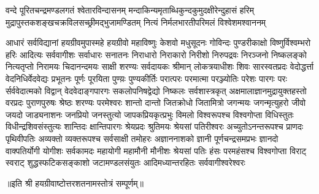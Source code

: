 
\fourlineindentedshloka
{वन्दे पूरितचन्द्रमण्डलगतं श्वेतारविन्दासनम्}
{मन्दाकिन्यमृताब्धिकुन्दकुमुदक्षीरेन्दुहासं हरिम्}
{मुद्रापुस्तकशङ्खचक्रविलसच्छ्रीमद्भुजामण्डितम्}
{नित्यं निर्मलभारतीपरिमलं विश्वेशमश्वाननम्}

{आधारं सर्वविद्यानां हयग्रीवमुपास्महे}
\twolineshloka
{हयग्रीवो महाविष्णुः केशवो मधुसूदनः}
{गोविन्दः पुण्डरीकाक्षो विष्णुर्विश्वम्भरो हरिः}
\twolineshloka
{आदित्यः सर्ववागीशः सर्वाधारः सनातनः}
{निराधारो निराकारो निरीशो निरुपद्रवः}
\twolineshloka
{निरञ्जनो  निष्कलङ्को नित्यतृप्तो निरामयः}
{चिदानन्दमयः साक्षी शरण्यः सर्वदायकः}
\twolineshloka
{श्रीमान् लोकत्रयाधीशः शिवः सारस्वतप्रदः}
{वेदोद्धर्त्ता वेदनिधिर्वेदवेद्यः प्रभूतनः}
\twolineshloka
{पूर्णः पूरयिता पुण्य़ः पुण्यकीर्तिः परात्परः}
{परमात्मा परञ्ज्योतिः परेशः पारगः परः}
\twolineshloka
{र्सर्ववेदात्मको विद्वान् वेदवेदाङ्गपारगः}
{सकलोपनिषद्वेद्यो निष्कलः सर्वशास्त्रकृत्}
\twolineshloka
{अक्षमालाज्ञानमुद्रायुक्तहस्तो वरप्रदः}
{पुराणपुरुषः श्रेष्ठः शरण्यः परमेश्वरः}
\twolineshloka
{शान्तो दान्तो जितक्रोधो जितामित्रो जगन्मयः}
{जगन्मृत्युहरो जीवो जयदो जाड्यनाशनः}
\twolineshloka
{जनप्रियो जनस्तुत्यो जापकप्रियकृत्प्रभुः}
{विमलो विश्वरूपश्च विश्वगोप्ता विधिस्तुतः}
\twolineshloka
{विधीन्द्रशिवसंस्तुत्यः शान्तिदः क्षान्तिपारगः}
{श्रेयप्रदः श्रुतिमयः श्रेयसां पतिरीश्वरः}
\twolineshloka
{अच्युतोऽनन्तरूपश्च प्राणदः पृथिवीपतिः}
{अव्यक्तो व्यक्तरूपश्च सर्वसाक्षी तमोहरः}
\twolineshloka
{अज्ञाननाशको ज्ञानी पूर्णचन्द्रसमप्रभः}
{ज्ञानदो वाक्पतिर्योगी योगीशः सर्वकामदः}
\twolineshloka
{महायोगी महामौनी मौनीशः श्रेयसां पतिः}
{हंसः परमहंसश्च विश्वगोप्ता विराट् स्वराट्}
\twolineshloka
{शुद्धस्फटिकसङ्काशो जटामण्डलसंयुतः}
{आदिमध्यान्तरहितः सर्ववागीश्वरेश्वरः}

॥इति श्री हयग्रीवाष्टोत्तरशतनामस्तोत्रं सम्पूर्णम्॥
